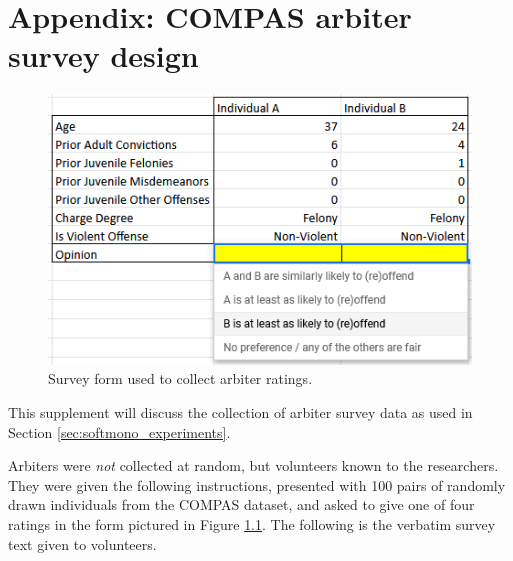 \chapter{Appendix: COMPAS arbiter survey design}\label{ch:appendix_softmono}

    \begin{figure}
        \centering
        \includegraphics{fig_softmono/survey_form.png}
        \caption{Survey form used to collect arbiter ratings.}
        \label{fig:sm_survey_form}
    \end{figure}

    This supplement will discuss the collection of arbiter survey data as used in Section \ref{sec:softmono_experiments}. 
    
    Arbiters were \emph{not} collected at random, but volunteers known to the researchers.  They were given the following instructions, presented with 100 pairs of randomly drawn individuals from the COMPAS\cite{larson2016we} dataset, and asked to give one of four ratings in the form pictured in Figure \ref{fig:sm_survey_form}.  The following is the verbatim survey text given to volunteers.

